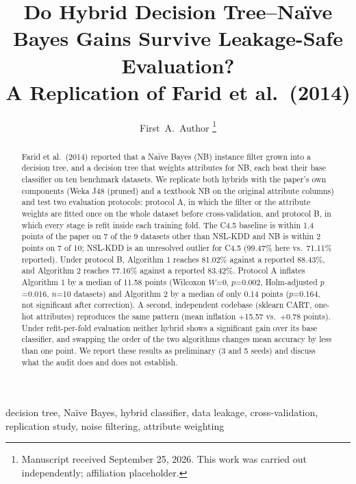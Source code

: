 \documentclass[journal]{IEEEtran}
\begin{document}
\title{Do Hybrid Decision Tree--Na\"ive Bayes Gains Survive Leakage-Safe Evaluation?\\
A Replication of Farid et al.\ (2014)}

\author{First~A.~Author%
  \thanks{Manuscript received September 25, 2026. This work was carried out
  independently; affiliation placeholder.}%
  }

\maketitle

\begin{abstract}
Farid et al.\ (2014) reported that a Na\"ive Bayes (NB) instance filter grown
into a decision tree, and a decision tree that weights attributes for NB,
each beat their base classifier on ten benchmark datasets. We replicate both
hybrids with the paper's own components (Weka J48 (pruned) and a
textbook NB on the original attribute columns) and test two evaluation
protocols: protocol A, in which the filter or the attribute weights are
fitted once on the whole dataset before cross-validation, and protocol B,
in which every stage is refit inside each training fold. The C4.5 baseline
is within 1.4 points of the paper on 7 of the 9 datasets other than NSL-KDD
and NB is within 2 points on 7 of 10; NSL-KDD is an unresolved outlier for
C4.5 (99.47\% here vs.\ 71.11\% reported). Under protocol B, Algorithm 1
reaches 81.02\% against a reported 88.43\%, and Algorithm 2 reaches 77.16\%
against a reported 83.42\%. Protocol A inflates Algorithm 1 by a median of 11.58 points
(Wilcoxon $W$=0, $p$=0.002, Holm-adjusted $p$=0.016, $n$=10 datasets) and
Algorithm 2 by a median of only 0.14 points ($p$=0.164, not significant after
correction). A second, independent codebase (sklearn CART, one-hot
attributes) reproduces the same pattern (mean inflation +15.57 vs.\ +0.78 points). Under refit-per-fold
evaluation neither hybrid shows a significant gain over its base classifier,
and swapping the order of the two algorithms changes mean accuracy by less
than one point. We
report these results as preliminary (3 and 5 seeds) and discuss what the
audit does and does not establish.
\end{abstract}

\begin{IEEEkeywords}
decision tree, Na\"ive Bayes, hybrid classifier, data leakage, cross-validation,
replication study, noise filtering, attribute weighting
\end{IEEEkeywords}

\IEEEpeerreviewmaketitle












\end{document}
